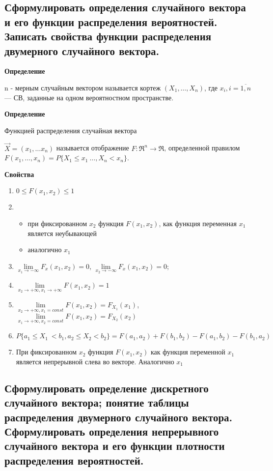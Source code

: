 \subsection{Сформулировать определения случайного вектора и его функции распределения вероятностей. Записать свойства функции распределения двумерного случайного вектора.}

\textbf{Определение}

n - мерным случайным вектором называется кортеж $(X_1, \dots, X_n)$, где $x_i, i=\overline{1,n}$ --- СВ, заданные на одном вероятностном пространстве.

\textbf{Определение}

Функцией распределения случайная вектора

$\overrightarrow{X} = (x_1, \dots x_n)$ называется отображение $F: \Re^n \rightarrow \Re$, определенной правилом $F(x_1, \dots, x_n) = P\{X_1 \leq x_1\ \dots, X_n < x_n\}$.

\textbf{Свойства}

\begin{enumerate}[label=\arabic*.]
	\item $0 \leq F(x_1, x_2) \leq 1$
	\item \begin{itemize}
		\item при фиксированном $x_2$ функция $F(x_1, x_2)$, как функция переменная $x_1$ является неубывающей
		\item аналогично $x_1$
	\end{itemize}
	\item $\lim\limits_{x_1 \rightarrow -\infty}F_x(x_1, x_2) = 0$, $\lim\limits_{x_2 \rightarrow -\infty}F_x(x_1, x_2) = 0$;
	\item $\lim\limits_{x_2 \rightarrow +\infty, x_1 \rightarrow +\infty}F(x_1, x_2) = 1$
	\item $\lim\limits_{x_2 \rightarrow +\infty, x_1 = const}F(x_1, x_2) = F_{X_1}(x_1)$, $\lim\limits_{x_1 \rightarrow +\infty, x_2 = const}F(x_1, x_2) = F_{X_2}(x_2)$
	\item $P\{a_1 \leq X_1\ < b_1, a_2 \leq X_2 < b_2\} = F(a_1, a_2) + F(b_1, b_2) - F(a_1, b_2) - F(b_1, a_2)$
	\item При фиксированном $x_2$ функция $F(x_1, x_2)$ как функция переменной $x_1$ является непрерывной слева во векторе. Аналогично $x_1$
\end{enumerate}

\subsection{Сформулировать определение дискретного случайного вектора; понятие таблицы распределения двумерного случайного вектора. Сформулировать определения непрерывного случайного вектора и его функции плотности распределения вероятностей.}

